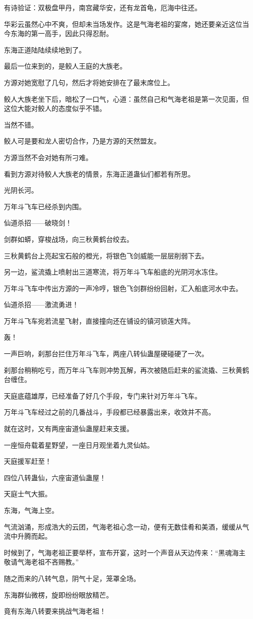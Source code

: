\begin{this_body}
有诗验证：双极盘甲丹，南宫藏华安，还有龙首龟，厄海中往还。

华彩云虽然心中不爽，但却未当场发作。这是气海老祖的宴席，她还要亲近这位当今东海的第一高手，因此只得忍耐。

东海正道陆陆续续地到了。

最后一位来到的，是鲛人王庭的大族老。

方源对她宽慰了几句，然后才将她安排在了最末席位上。

鲛人大族老坐下后，暗松了一口气，心道：虽然自己和气海老祖是第一次见面，但这位大能对鲛人的态度似乎不错。

当然不错。

鲛人可是要和龙人密切合作，乃是方源的天然盟友。

方源当然不会对她有所刁难。

看到方源对待鲛人大族老的情景，东海正道蛊仙们都若有所思。

光阴长河。

万年斗飞车已经杀到内围。

仙道杀招——破晓剑！

剑群如蟒，穿梭战场，向三秋黄鹤台绞去。

三秋黄鹤台上亮起宝石般的橙光，将银色飞剑威能一层层削弱下去。

另一边，鲨流撬上喷射出三道寒流，将万年斗飞车船底的光阴河水冻住。

万年斗飞车中传出方源的一声冷哼，银色飞剑群纷纷回射，汇入船底河水中去。

仙道杀招——激流勇进！

万年斗飞车宛若流星飞射，直接撞向还在铺设的镇河锁莲大阵。

轰！

一声巨响，刹那台拦住万年斗飞车，两座八转仙蛊屋硬碰硬了一次。

刹那台稍稍吃亏，而万年斗飞车则冲势瓦解，再次被随后赶来的鲨流撬、三秋黄鹤台缠住。

天庭底蕴雄厚，已经准备了好几个手段，专门来针对万年斗飞车。

万年斗飞车经过之前的几番战斗，手段都已经暴露出来，收效并不高。

就在这时，又有两座宙道仙蛊屋赶来支援。

一座恒舟载着星野望，一座日月观坐着九灵仙姑。

天庭援军赶至！

四位八转蛊仙，六座宙道仙蛊屋！

天庭士气大振。

东海，气海上空。

气流汹涌，形成浩大的云团，气海老祖心念一动，便有无数佳肴和美酒，缓缓从气流中升腾而起。

时候到了，气海老祖正要举杯，宣布开宴，这时一个声音从天边传来：“黑魂海主敬请气海老祖不吝赐教。”

随之而来的八转气息，阴气十足，笼罩全场。

东海群仙微楞，旋即纷纷眼放精芒。

竟有东海八转要来挑战气海老祖！

\end{this_body}

